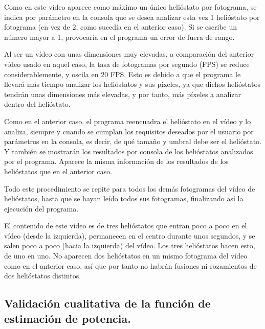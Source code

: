 Como en este vídeo aparece como máximo un único helióstato por fotograma, se indica por parámetro en la consola que se desea analizar esta vez 1 helióstato por fotograma (en vez de 2, como sucedía en el anterior caso). Si se escribe un número mayor a 1, provocaría en el programa un error de fuera de rango.

Al ser un vídeo con unas dimensiones muy elevadas, a comparación del anterior vídeo usado en aquel caso, la tasa de fotogramas por segundo (FPS) se reduce considerablemente, y oscila en 20 FPS. Esto es debido a que el programa le llevará más tiempo analizar los helióstatos y sus píxeles, ya que dichos helióstatos tendrán unas dimensiones más elevadas, y por tanto, más píxeles a analizar dentro del helióstato.

Como en el anterior caso, el programa reencuadra el helióstato en el vídeo y lo analiza, siempre y cuando se cumplan los requisitos deseados por el usuario por parámetros en la consola, es decir, de qué tamaño y umbral debe ser el helióstato. Y también se mostrarán los resultados por consola de los helióstatos analizados por el programa. Aparece la misma información de los resultados de los helióstatos que en el anterior caso.

Todo este procedimiento se repite para todos los demás fotogramas del vídeo de helióstatos, hasta que se hayan leído todos sus fotogramas, finalizando así la ejecución del programa.

El contenido de este vídeo es de tres helióstatos que entran poco a poco en el vídeo (desde la izquierda), permanecen en el centro durante unos segundos, y se salen poco a poco (hacia la izquierda) del vídeo. Los tres helióstatos hacen esto, de uno en uno. No aparecen dos helióstatos en un mismo fotograma del vídeo como en el anterior caso, así que por tanto no habrán fusiones ni rozamientos de dos helióstatos distintos.

\subsection{Validación cualitativa de la función de estimación de potencia.}

